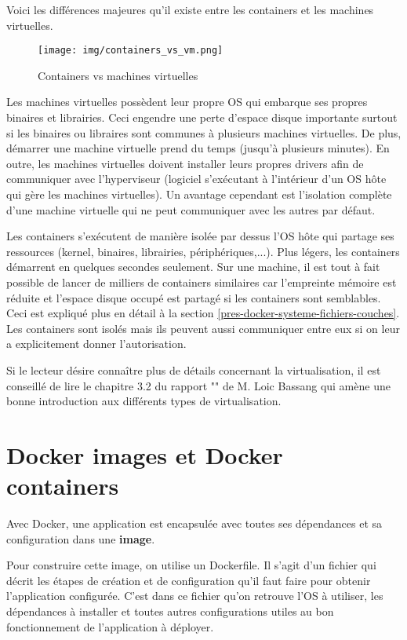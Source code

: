 Voici les différences majeures qu'il existe entre les containers et les machines virtuelles\cite{what_is_docker}.

\begin{figure}[hbtp]
\centering
\texttt{[image: img/containers\_vs\_vm.png]}
\caption{Containers vs machines virtuelles}
\end{figure}

Les machines virtuelles possèdent leur propre OS qui embarque ses propres binaires et librairies. Ceci engendre une perte d'espace disque importante surtout si les binaires ou libraires sont communes à plusieurs machines virtuelles. De plus, démarrer une machine virtuelle prend du temps (jusqu'à plusieurs minutes). En outre, les machines virtuelles doivent installer leurs propres drivers afin de communiquer avec l'hyperviseur (logiciel s'exécutant à l'intérieur d'un OS hôte qui gère les machines virtuelles). Un avantage cependant est l'isolation complète d'une machine virtuelle qui ne peut communiquer avec les autres par défaut.

Les containers s'exécutent de manière isolée par dessus l'OS hôte qui partage ses ressources (kernel, binaires, librairies, périphériques,...). Plus légers, les containers démarrent en quelques secondes seulement. Sur une machine, il est tout à fait possible de lancer de milliers de containers similaires car l'empreinte mémoire est réduite et l'espace disque occupé est partagé si les containers sont semblables. Ceci est expliqué plus en détail à la section \ref{pres-docker-systeme-fichiers-couches}. Les containers sont isolés mais ils peuvent aussi communiquer entre eux si on leur a explicitement donner l'autorisation.

Si le lecteur désire connaître plus de détails concernant la virtualisation, il est conseillé de lire le chapitre 3.2 du rapport "\bassangPrjSemestre" de M. Loic Bassang \cite{bassang_semestre} qui amène une bonne introduction aux différents types de virtualisation.


\section{Docker images et Docker containers}
Avec Docker, une application est encapsulée avec toutes ses dépendances et sa configuration dans une \textbf{image}. 

Pour construire cette image, on utilise un Dockerfile. Il s'agit d'un fichier qui décrit les étapes de création et de configuration qu'il faut faire pour obtenir l'application configurée. C'est dans ce fichier qu'on retrouve l'OS à utiliser, les dépendances à installer et toutes autres configurations utiles au bon fonctionnement de l'application à déployer. 

